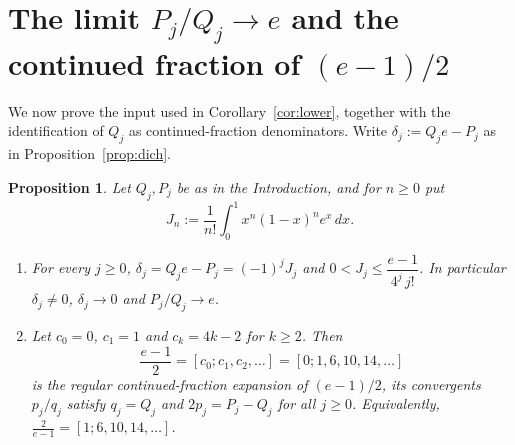 \documentclass[11pt]{amsart}
\newtheorem{proposition}[theorem]{Proposition}
\theoremstyle{remark}
\begin{document}
\section{The limit $P_j/Q_j\to e$ and the continued fraction of $(e-1)/2$}\label{sec:input}

We now prove the input used in Corollary~\ref{cor:lower}, together with the identification of $Q_j$
as continued-fraction denominators. Write $\delta_j:=Q_je-P_j$ as in Proposition~\ref{prop:dich}.

\begin{proposition}\label{prop:input}
Let $Q_j,P_j$ be as in the Introduction, and for $n\ge0$ put
\[
J_n:=\frac1{n!}\int_0^1x^n(1-x)^n e^x\,dx .
\]
\begin{enumerate}
\item[(i)] For every $j\ge0$, $\delta_j=Q_je-P_j=(-1)^jJ_j$ and $0<J_j\le\dfrac{e-1}{4^j\,j!}$. In particular
$\delta_j\ne0$, $\delta_j\to0$ and $P_j/Q_j\to e$.
\item[(ii)] Let $c_0=0$, $c_1=1$ and $c_k=4k-2$ for $k\ge2$. Then
\[
\frac{e-1}{2}=[c_0;c_1,c_2,\dots]=[0;1,6,10,14,\dots]
\]
is the regular continued-fraction expansion of $(e-1)/2$, its convergents $p_j/q_j$ satisfy
$q_j=Q_j$ and $2p_j=P_j-Q_j$ for all $j\ge0$. Equivalently, $\frac2{e-1}=[1;6,10,14,\dots]$.
\end{enumerate}
\end{proposition}
\end{document}
